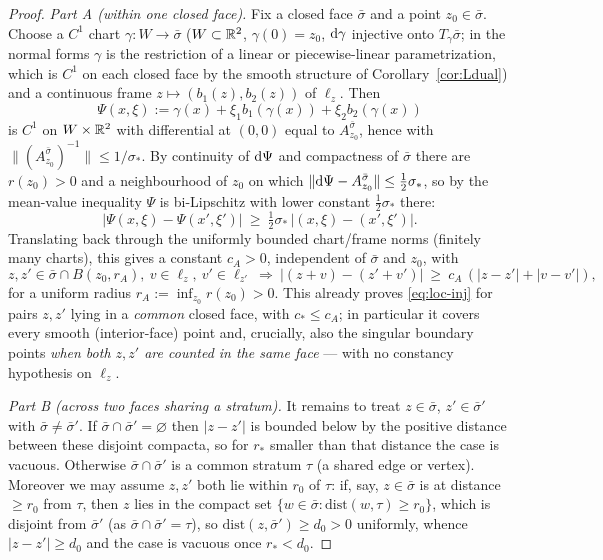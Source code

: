 \begin{proof}
\medskip\noindent\emph{Part A (within one closed face).} Fix a closed face
$\bar\sigma$ and a point $z_0\in\bar\sigma$. Choose a $C^1$ chart $\gamma\colon W\to
\bar\sigma$ ($W\subset\mathbb{R}^2$, $\gamma(0)=z_0$, $\mathrm d\gamma$ injective onto
$T_\gamma\bar\sigma$; in the normal forms $\gamma$ is the restriction of a linear or
piecewise-linear parametrization, which is $C^1$ on each closed face by the smooth
structure of Corollary~\ref{cor:Ldual}) and a continuous frame
$z\mapsto(b_1(z),b_2(z))$ of $\ell_z$. Then
\[
\Psi(x,\xi):=\gamma(x)+\xi_1 b_1(\gamma(x))+\xi_2 b_2(\gamma(x))
\]
is $C^1$ on $W\times\mathbb{R}^2$ with differential at $(0,0)$ equal to $A^{\bar\sigma}_{z_0}$,
hence with $\|(A^{\bar\sigma}_{z_0})^{-1}\|\le1/\sigma_\ast$. By continuity of
$\mathrm d\Psi$ and compactness of $\bar\sigma$ there are $r(z_0)>0$ and a neighbourhood
of $z_0$ on which $\|\mathrm d\Psi-A^{\bar\sigma}_{z_0}\|\le\tfrac12\sigma_\ast$, so by the
mean-value inequality $\Psi$ is bi-Lipschitz with lower constant $\tfrac12\sigma_\ast$
there:
\[
|\Psi(x,\xi)-\Psi(x',\xi')|\ \ge\ \tfrac12\sigma_\ast\,|(x,\xi)-(x',\xi')| .
\]
Translating back through the uniformly bounded chart/frame norms (finitely many
charts), this gives a constant $c_A>0$, independent of $\bar\sigma$ and $z_0$, with
\begin{equation}\label{eq:withinface}
z,z'\in\bar\sigma\cap B(z_0,r_A),\ v\in\ell_z,\ v'\in\ell_{z'}\ \Longrightarrow\
|(z+v)-(z'+v')|\ \ge\ c_A\,(|z-z'|+|v-v'|),
\end{equation}
for a uniform radius $r_A:=\inf_{z_0}r(z_0)>0$. This already proves \eqref{eq:loc-inj}
for pairs $z,z'$ lying in a \emph{common} closed face, with $c_\ast\le c_A$; in
particular it covers every smooth (interior-face) point and, crucially, also the
singular boundary points \emph{when both $z,z'$ are counted in the same face} --- with
no constancy hypothesis on $\ell_z$.

\medskip\noindent\emph{Part B (across two faces sharing a stratum).} It remains to
treat $z\in\bar\sigma$, $z'\in\bar\sigma'$ with $\bar\sigma\ne\bar\sigma'$. If
$\bar\sigma\cap\bar\sigma'=\varnothing$ then $|z-z'|$ is bounded below by the positive
distance between these disjoint compacta, so for $r_\ast$ smaller than that distance
the case is vacuous. Otherwise $\bar\sigma\cap\bar\sigma'$ is a common stratum $\tau$
(a shared edge or vertex). Moreover we may assume $z,z'$ both lie within $r_0$ of
$\tau$: if, say, $z\in\bar\sigma$ is at distance $\ge r_0$ from $\tau$, then $z$ lies
in the compact set $\{w\in\bar\sigma:\mathrm{dist}(w,\tau)\ge r_0\}$, which is disjoint
from $\bar\sigma'$ (as $\bar\sigma\cap\bar\sigma'=\tau$), so $\mathrm{dist}(z,\bar\sigma')
\ge d_0>0$ uniformly, whence $|z-z'|\ge d_0$ and the case is vacuous once $r_\ast<d_0$.


\end{proof}
